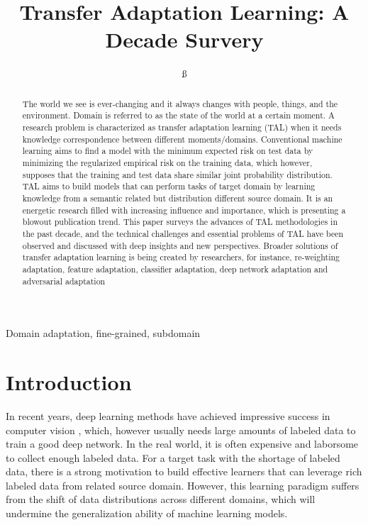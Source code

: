 \documentclass[conference]{IEEEtran}
\begin{document}
\title{Transfer Adaptation Learning: A Decade Survery}

\author{
ß
}

\maketitle

\begin{abstract}
The world we see is ever-changing and it always changes with people, things, and the environment. Domain is referred to as the state of the world at a certain moment. 
A research problem is characterized as transfer adaptation learning (TAL) when it needs knowledge correspondence between different moments/domains. 
Conventional machine learning aims to find a model with the minimum expected risk on test data by minimizing the regularized empirical risk on the training data, which however, supposes that the training and test data share similar joint probability distribution.
TAL aims to build models that can perform tasks of target domain by learning knowledge from a semantic related but distribution different source domain.
It is an energetic research filled with increasing influence and importance, which is presenting a blowout publication trend. This paper surveys the advances of TAL methodologies in the past decade, and the technical challenges and essential problems of TAL have been observed and discussed with deep insights and new perspectives.
Broader solutions of transfer adaptation learning is being created by researchers, for instance, re-weighting adaptation, feature adaptation, classifier adaptation, deep network adaptation and adversarial adaptation
\end{abstract}

\begin{IEEEkeywords}
Domain adaptation, fine-grained, subdomain
\end{IEEEkeywords}

\section{Introduction}
In recent years, deep learning methods have achieved impressive success in computer vision \cite{b1}, which, however usually needs large amounts of labeled data to train a good deep network.
In the real world, it is often expensive and laborsome to collect enough labeled data. For a target task with the shortage of labeled data, there is a strong motivation to build effective learners that can leverage rich labeled data from related source domain.
However, this learning paradigm suffers from the shift of data distributions across different domains, which will undermine the generalization ability of machine learning models.
\end{document}
